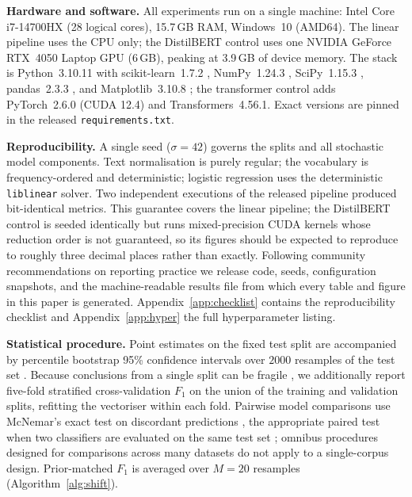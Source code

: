 \documentclass[conference]{IEEEtran}
\newcommand{\Fone}{$F_1$}
\begin{document}
\textbf{Hardware and software.} All experiments run on a single machine: Intel
Core i7-14700HX (28 logical cores), 15.7\,GB RAM, Windows~10 (AMD64). The linear
pipeline uses the CPU only; the DistilBERT control uses one NVIDIA GeForce
RTX~4050 Laptop GPU (6\,GB), peaking at 3.9\,GB of device memory. The stack is
Python~3.10.11 with scikit-learn~1.7.2 \cite{pedregosa2011scikit},
NumPy~1.24.3 \cite{harris2020array}, SciPy~1.15.3 \cite{virtanen2020scipy},
pandas~2.3.3 \cite{mckinney2010data}, and Matplotlib~3.10.8
\cite{hunter2007matplotlib}; the transformer control adds PyTorch~2.6.0 (CUDA
12.4) and Transformers~4.56.1. Exact versions are pinned in the released
\texttt{requirements.txt}.

\textbf{Reproducibility.} A single seed ($\sigma=42$) governs the splits and all
stochastic model components. Text normalisation is purely regular; the
vocabulary is frequency-ordered and deterministic; logistic regression uses the
deterministic \texttt{liblinear} solver. Two independent executions of the
released pipeline produced bit-identical metrics. This guarantee covers the
linear pipeline; the DistilBERT control is seeded identically but runs
mixed-precision CUDA kernels whose reduction order is not guaranteed, so its
figures should be expected to reproduce to roughly three decimal places rather
than exactly. Following community
recommendations on reporting practice
\cite{pineau2021improving,reimers2017reporting} we release code, seeds,
configuration snapshots, and the machine-readable results file from which every
table and figure in this paper is generated. Appendix~\ref{app:checklist}
contains the reproducibility checklist and Appendix~\ref{app:hyper} the full
hyperparameter listing.

\textbf{Statistical procedure.} Point estimates on the fixed test split are
accompanied by percentile bootstrap 95\% confidence intervals over $2000$
resamples of the test set \cite{efron1993introduction}. Because conclusions from
a single split can be fragile \cite{gorman2019we}, we additionally report
five-fold stratified cross-validation \Fone{} on the union of the training and
validation splits, refitting the vectoriser within each fold. Pairwise model
comparisons use McNemar's exact test on discordant predictions
\cite{mcnemar1947note,dietterich1998approximate}, the appropriate paired test
when two classifiers are evaluated on the same test set
\cite{dror2018hitchhiker}; omnibus procedures designed for comparisons across
many datasets \cite{demsar2006statistical} do not apply to a single-corpus
design. Prior-matched \Fone{} is averaged over $M=20$ resamples
(Algorithm~\ref{alg:shift}).
\end{document}
